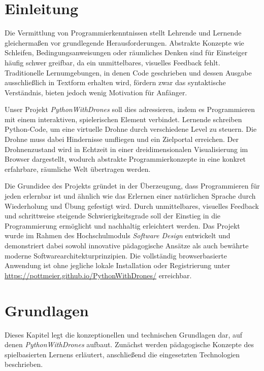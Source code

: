 \documentclass[a4paper,12pt]{article}
\begin{document}
	\section{Einleitung}
	
	Die Vermittlung von Programmierkenntnissen stellt Lehrende und Lernende
	gleichermaßen vor grundlegende Herausforderungen. Abstrakte Konzepte wie
	Schleifen, Bedingungsanweisungen oder räumliches Denken sind für
	Einsteiger häufig schwer greifbar, da ein unmittelbares, visuelles
	Feedback fehlt. Traditionelle Lernumgebungen, in denen Code geschrieben
	und dessen Ausgabe ausschließlich in Textform erhalten wird, fördern
	zwar das syntaktische Verständnis, bieten jedoch wenig Motivation für
	Anfänger.
	
	Unser Projekt \textit{PythonWithDrones} soll dies adressieren,
	indem es Programmieren mit einem interaktiven, spielerischen
	Element verbindet. Lernende schreiben Python-Code, um eine virtuelle
	Drohne durch verschiedene Level zu steuern. Die Drohne muss dabei
	Hindernisse umfliegen und ein Zielportal erreichen. Der Drohnenzustand
	wird in Echtzeit in einer dreidimensionalen Visualisierung im Browser
	dargestellt, wodurch abstrakte Programmierkonzepte in eine konkret
	erfahrbare, räumliche Welt übertragen werden.
	
	Die Grundidee des Projekts gründet in der Überzeugung, dass Programmieren
	für jeden erlernbar ist und ähnlich wie das Erlernen einer natürlichen Sprache
	durch Wiederholung und Übung gefestigt wird. Durch unmittelbares, visuelles Feedback 
	und schrittweise steigende Schwierigkeitsgrade soll der Einstieg in die Programmierung
	ermöglicht und nachhaltig erleichtert werden. Das Projekt wurde im Rahmen des
	Hochschulmoduls \textit{Software Design} entwickelt und demonstriert
	dabei sowohl innovative pädagogische Ansätze als auch bewährte moderne
	Softwarearchitekturprinzipien. Die vollständig browserbasierte Anwendung
	ist ohne jegliche lokale Installation oder Registrierung unter
	\url{https://pottmeier.github.io/PythonWithDrones/} erreichbar.

 	\section{Grundlagen}
	Dieses Kapitel legt die konzeptionellen und technischen Grundlagen dar,
	auf denen \linebreak \textit{PythonWithDrones} aufbaut. Zunächst werden pädagogische Konzepte des spielbasierten Lernens erläutert, anschließend die eingesetzten Technologien beschrieben.
	
\end{document}
